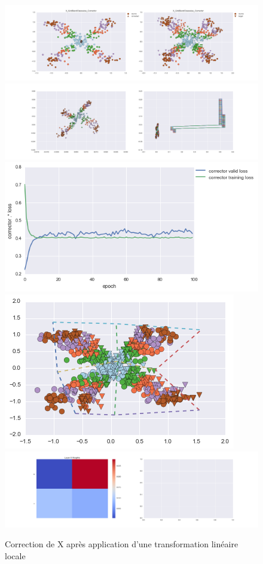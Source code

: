 \begin{figure}[H] %
\centering
\includegraphics[width=\linewidth]{fig/24-05-2016/X/X_GridBendClasswise_Corrector-DATA.png}
\includegraphics[width=\linewidth]{fig/24-05-2016/X/X_GridBendClasswise_Corrector-GridCheck.png}
\includegraphics[width=0.45\linewidth]{fig/24-05-2016/X/X_GridBendClasswise_Corrector-Learning_curve.png}
\includegraphics[width=0.45\linewidth]{fig/24-05-2016/X/X_grid.png}
\includegraphics[width=\linewidth]{fig/24-05-2016/X/X_GridBendClasswise_Corrector-W.png}
\caption{Correction de X après application d'une transformation linéaire locale}
\label{fig:recap-X-GridBend-classwise}
\end{figure}


